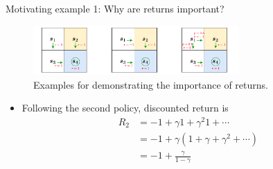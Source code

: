 \documentclass[aspectratio=169,xcolor=dvipsnames]{beamer}
\begin{document}

\begin{frame}{Motivating example 1: Why are returns important?}
    
\begin{figure}
	\centering
	\includegraphics[width=0.7\textwidth]{../imgs/chap2/ex_importance_returns.pdf}
	\caption{Examples for demonstrating the importance of returns.}
\end{figure}

\begin{itemize}
	\item Following the second policy, discounted return is
	\begin{equation*}
		\begin{aligned}
			R_2 
			&= -1 + \gamma 1 + \gamma^2 1 + \cdots \\
			&= -1 + \gamma (1 + \gamma + \gamma^2 + \cdots) \\
			&= -1 + \frac{\gamma}{1 - \gamma} \\
		\end{aligned}
	\end{equation*}
\end{itemize}

\end{frame}

\end{document}
